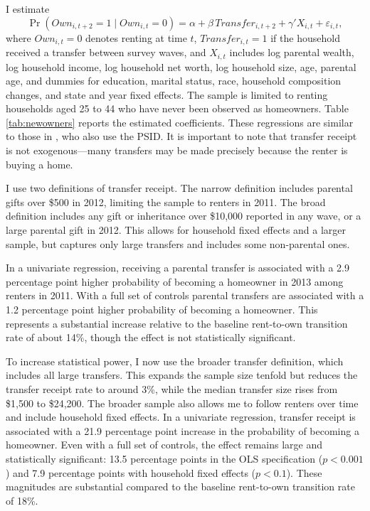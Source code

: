 \documentclass[12pt]{article}
\begin{document}
I estimate
\begin{equation}	\label{eq:transferrent}
	\Pr\left(Own_{i,t+2}=1 \mid Own_{i,t}=0\right)
	= \alpha + \beta\,Transfer_{i,t+2}
	  + \gamma' X_{i,t} + \varepsilon_{i,t},
\end{equation}
where \(Own_{i,t}=0\) denotes renting at time \(t\), \(Transfer_{i,t}=1\) if the household received a transfer between survey waves, and \(X_{i,t}\) includes log parental wealth, log household income, log household net worth, log household size, age, parental age, and dummies for  education, marital status, race, household composition changes, and state and year fixed effects. The sample is limited to renting households aged 25 to 44 who have never been observed as homeowners. Table \ref{tab:newowners} reports the estimated coefficients. These regressions are similar to those in \cite{Lee2018}, who also use the PSID.  It is important to note that transfer receipt is not exogenous---many transfers may be made precisely because the renter is buying a home.

I use two definitions of transfer receipt. The narrow definition includes parental gifts over \$500 in 2012, limiting the sample to renters in 2011. The broad definition includes any gift or inheritance over \$10,000 reported in any wave, or a large parental gift in 2012. This allows for household fixed effects and a larger sample, but captures only large transfers and includes some non-parental ones.

In a univariate regression, receiving a parental transfer is associated with a 2.9 percentage point higher probability of becoming a homeowner in 2013 among renters in 2011. With a full set of controls parental transfers are associated with a 1.2 percentage point higher probability of becoming a homeowner. This represents a substantial increase relative to the baseline rent-to-own transition rate of about 14\%, though the effect is not statistically significant. 

To increase statistical power, I now use the broader transfer definition, which includes all large transfers. This expands the sample size tenfold but reduces the transfer receipt rate to around 3\%, while the median transfer size rises from \$1,500 to \$24,200. The broader sample also allows me to follow renters over time and include household fixed effects. In a univariate regression, transfer receipt is associated with a 21.9 percentage point increase in the probability of becoming a homeowner. Even with a full set of controls, the effect remains large and statistically significant: 13.5 percentage points in the OLS specification ($p<0.001$) and 7.9 percentage points with household fixed effects ($p<0.1$). These magnitudes are substantial compared to the baseline rent-to-own transition rate of 18\%.
\end{document}
